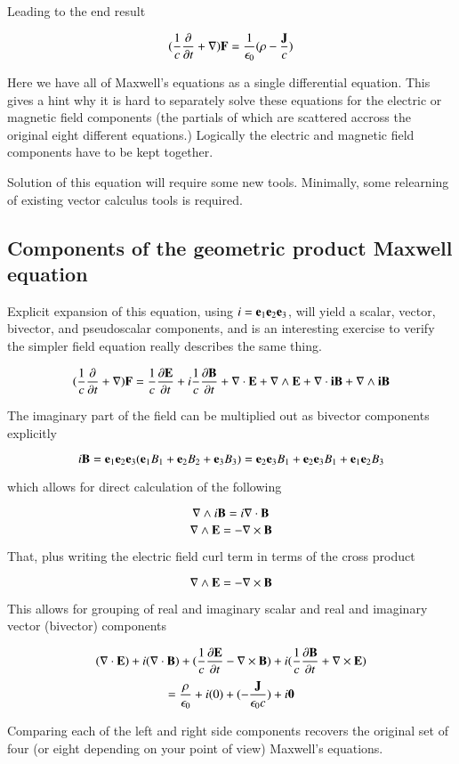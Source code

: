 \documentclass{article}      %
\begin{document}
Leading to the end result

\[
(\frac{1}{c} \frac{\partial}{\partial t} + \nabla)\mathbf{F} = \frac {1} {\epsilon_0}(\rho - \frac{\mathbf{J}}{c})
\]

Here we have all of Maxwell's equations as a single differential equation.
This gives a hint why it is hard to separately solve these equations for the electric or magnetic field components (the partials of which are scattered accross the original eight different equations.)  Logically the electric and magnetic field components have to be kept together.

Solution of this equation will require some new tools.  Minimally, some relearning of existing vector calculus tools is required.

\subsection{Components of the geometric product Maxwell equation }

Explicit expansion of this equation, using $i={\mathbf{e}}_1{\mathbf{e}}_2{\mathbf{e}}_3$, will yield a scalar, vector, bivector, and pseudoscalar components, and is an interesting exercise to verify the simpler field equation really describes the same thing.

\[
(\frac{1}{c} \frac{\partial}{\partial t} + \nabla)\mathbf{F}
= \frac{1}{c} \frac{\partial \mathbf{E}}{\partial t} + i\frac{1}{c} \frac{\partial \mathbf{B}}{\partial t}
+ \nabla \cdot \mathbf{E} + \nabla \wedge \mathbf{E} + \nabla \cdot \mathbf{iB} + \nabla \wedge \mathbf{iB}
\]

The imaginary part of the field can be multiplied out as bivector components explicitly

\[
i \mathbf{B} = \mathbf{e} _1 \mathbf{e} _2 \mathbf{e} _3 ( \mathbf{e} _1 B_1 + \mathbf{e} _2 B_2 + \mathbf{e} _3 B_3 )
= \mathbf{e} _2 \mathbf{e} _3 B_1 + \mathbf{e} _2 \mathbf{e} _3 B_1 + \mathbf{e} _1 \mathbf{e} _2 B_3
\]

which allows for direct calculation of the following

\[
\nabla \wedge i\mathbf{B} = i\nabla \cdot \mathbf{B}
\]
\[
\nabla \wedge \mathbf{E} = -\nabla \times \mathbf{B}
\]

That, plus writing the electric field curl term in terms of the cross product

\[
\nabla \wedge \mathbf{E} = -\nabla \times \mathbf{B}
\]

This allows for grouping of real and imaginary scalar and real and imaginary vector (bivector) components

\[
   (\nabla \cdot \mathbf{E}) + i(\nabla \cdot \mathbf{B})
+
   (\frac{1}{c} \frac{\partial \mathbf{E}}{\partial t} - \nabla \times \mathbf{B})
+ i(\frac{1}{c} \frac{\partial \mathbf{B}}{\partial t} + \nabla \times \mathbf{E})
\]
\[
= \frac{\rho}{\epsilon_0} + i(0) + (-\frac{\mathbf{J}}{\epsilon_0 c}) + i \mathbf{0}
\]

Comparing each of the left and right side components recovers the original set of four (or eight depending on your point of view) Maxwell's equations.
\end{document}
